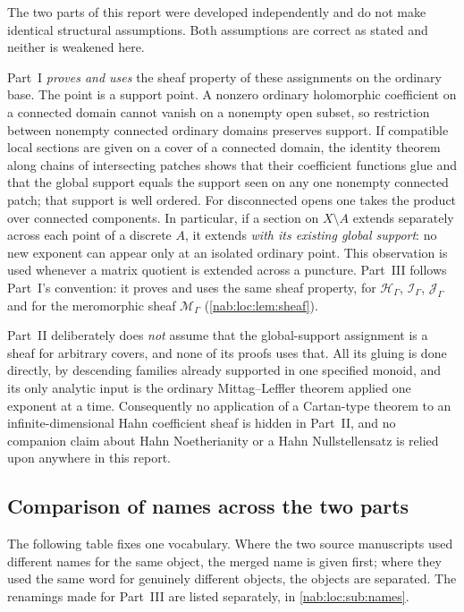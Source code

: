 \documentclass[11pt,letterpaper]{article}
\theoremstyle{definition}
\theoremstyle{remark}
\newcommand{\HH}{\mathscr H_\Gamma}
\newcommand{\II}{\mathscr I_\Gamma}
\newcommand{\JJ}{\mathscr J_\Gamma}
\newcommand{\MM}{\mathscr M_\Gamma}
\numberwithin{equation}{section}
\begin{document}
The two parts of this report were developed independently and do not make
identical structural assumptions. Both assumptions are correct as stated and
neither is weakened here.

Part~I \emph{proves and uses} the sheaf property of these assignments on the
ordinary base. The point is a support point. A nonzero ordinary holomorphic
coefficient on a connected domain cannot vanish on a nonempty open subset, so
restriction between nonempty connected ordinary domains preserves support. If
compatible local sections are given on a cover of a connected domain, the
identity theorem along chains of intersecting patches shows that their
coefficient functions glue and that the global support equals the support seen
on any one nonempty connected patch; that support is well ordered. For
disconnected opens one takes the product over connected components. In
particular, if a section on $X\setminus A$ extends separately across each
point of a discrete $A$, it extends \emph{with its existing global support}:
no new exponent can appear only at an isolated ordinary point. This
observation is used whenever a matrix quotient is extended across a puncture.
Part~III follows Part~I's convention: it proves and uses the same sheaf
property, for $\HH$, $\II$, $\JJ$ and for the meromorphic sheaf $\MM$
(\cref{nab:loc:lem:sheaf}).

Part~II deliberately does \emph{not} assume that the global-support assignment
is a sheaf for arbitrary covers, and none of its proofs uses that. All its
gluing is done directly, by descending families already supported in one
specified monoid, and its only analytic input is the ordinary
Mittag--Leffler theorem applied one exponent at a time. Consequently no
application of a Cartan-type theorem to an infinite-dimensional Hahn
coefficient sheaf is hidden in Part~II, and no companion claim about Hahn
Noetherianity or a Hahn Nullstellensatz is relied upon anywhere in this
report.

\subsection{Comparison of names across the two parts}
\label{nab:sub:names}

The following table fixes one vocabulary. Where the two source manuscripts
used different names for the same object, the merged name is given first;
where they used the same word for genuinely different objects, the objects are
separated. The renamings made for Part~III are listed separately, in
\cref{nab:loc:sub:names}.
\end{document}
